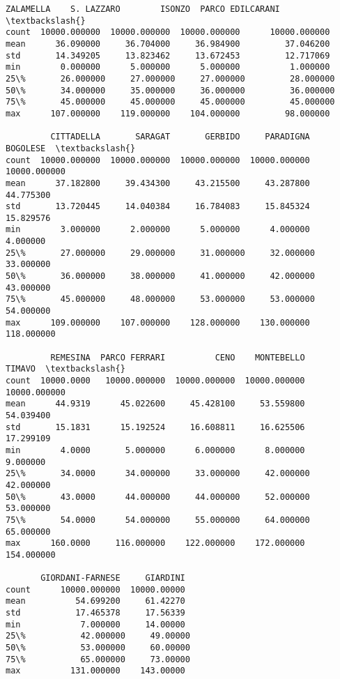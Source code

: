 \documentclass[11pt]{article}
\begin{document}
\begin{tcolorbox}[breakable, size=fbox, boxrule=.5pt, pad at break*=1mm, opacityfill=0]
\begin{Verbatim}[commandchars=\\\{\}]
          ZALAMELLA    S. LAZZARO        ISONZO  PARCO EDILCARANI  \textbackslash{}
count  10000.000000  10000.000000  10000.000000      10000.000000
mean      36.090000     36.704000     36.984900         37.046200
std       14.349205     13.823462     13.672453         12.717069
min        0.000000      5.000000      5.000000          1.000000
25\%       26.000000     27.000000     27.000000         28.000000
50\%       34.000000     35.000000     36.000000         36.000000
75\%       45.000000     45.000000     45.000000         45.000000
max      107.000000    119.000000    104.000000         98.000000

         CITTADELLA       SARAGAT       GERBIDO     PARADIGNA      BOGOLESE  \textbackslash{}
count  10000.000000  10000.000000  10000.000000  10000.000000  10000.000000
mean      37.182800     39.434300     43.215500     43.287800     44.775300
std       13.720445     14.040384     16.784083     15.845324     15.829576
min        3.000000      2.000000      5.000000      4.000000      4.000000
25\%       27.000000     29.000000     31.000000     32.000000     33.000000
50\%       36.000000     38.000000     41.000000     42.000000     43.000000
75\%       45.000000     48.000000     53.000000     53.000000     54.000000
max      109.000000    107.000000    128.000000    130.000000    118.000000

         REMESINA  PARCO FERRARI          CENO    MONTEBELLO        TIMAVO  \textbackslash{}
count  10000.0000   10000.000000  10000.000000  10000.000000  10000.000000
mean      44.9319      45.022600     45.428100     53.559800     54.039400
std       15.1831      15.192524     16.608811     16.625506     17.299109
min        4.0000       5.000000      6.000000      8.000000      9.000000
25\%       34.0000      34.000000     33.000000     42.000000     42.000000
50\%       43.0000      44.000000     44.000000     52.000000     53.000000
75\%       54.0000      54.000000     55.000000     64.000000     65.000000
max      160.0000     116.000000    122.000000    172.000000    154.000000

       GIORDANI-FARNESE     GIARDINI
count      10000.000000  10000.00000
mean          54.699200     61.42270
std           17.465378     17.56339
min            7.000000     14.00000
25\%           42.000000     49.00000
50\%           53.000000     60.00000
75\%           65.000000     73.00000
max          131.000000    143.00000
\end{Verbatim}
\end{tcolorbox}
        
\end{document}
